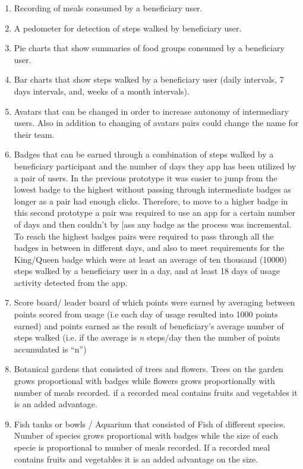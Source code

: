 \begin{enumerate}
\item{Recording of meals} consumed by a beneficiary user.
\item{A pedometer} for detection of steps walked by beneficiary user.
\item{Pie charts} that show summaries of food groups consumed by a beneficiary user.
\item{Bar charts} that show steps walked by a beneficiary user (daily intervals, 7 days intervals, and, weeks of a month intervals).
\item{Avatars} that can be changed in order to increase autonomy of intermediary users. Also in addition to changing of avatars pairs could change the name for their team.
\item{Badges} that can be earned through a combination of steps walked by a beneficiary participant and the number of days they app has been utilized by a pair of users. In the previous prototype it was easier to jump from the lowest badge to the highest without passing through intermediate badges as longer as a pair had enough clicks. Therefore, to move to a higher badge in this second prototype a pair was required to use an app for a certain number of days and then couldn't by [ass any badge as the process was incremental. To reach the highest badges pairs were required to pass through all the badges in between in different days, and also to meet requirements for the King/Queen badge which were at least an average of ten thousand (10000) steps walked by a beneficiary user in a day, and at least 18 days of usage activity detected from the app. 
\item{Score board/ leader board} of which points were earned by averaging between points scored from usage (i.e each day of usage resulted into 1000 points earned) and points earned as the result of beneficiary's average number of steps walked (i.e. if the average is \emph{n} steps/day then the number of points accumulated is ``n'')
\item{Botanical gardens} that consisted of trees and flowers. Trees on the garden grows proportional with badges while flowers grows proportionally with number of meals recorded. if a recorded meal contains fruits and vegetables it is an added advantage.
\item{Fish tanks or bowls / Aquarium} that consisted of Fish of different species. Number of species grows proportional with badges while the size of each specie is proportional to number of meals recorded. If a recorded meal contains fruits and vegetables it is an added advantage on the size.
\end{enumerate}
